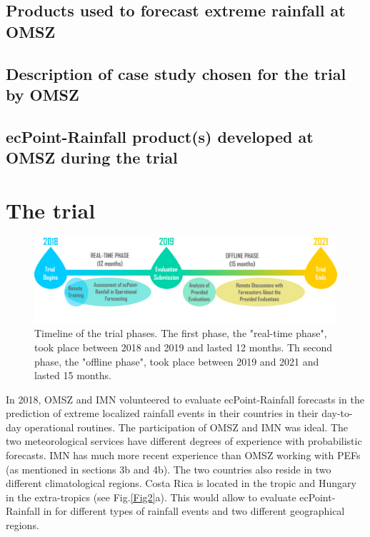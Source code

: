 \documentclass[twocol]{ametsocV5} %
\begin{document}
\subsection{Products used to forecast extreme rainfall at OMSZ}

\subsection{Description of case study chosen for the trial by OMSZ}

\subsection{ecPoint-Rainfall product(s) developed at OMSZ during the trial}



\section{The trial} 

\begin{figure}
\centerline{\includegraphics[width=39pc]{manuscript/Figures/Fig4.png}}
\caption{Timeline of the trial phases. The first phase, the "real-time phase", took place between 2018 and 2019 and lasted 12 months. Th second phase, the "offline phase", took place between 2019 and 2021 and lasted 15 months.}
\label{Fig4}
\end{figure}

In 2018, OMSZ and IMN volunteered to evaluate ecPoint-Rainfall forecasts in the prediction of extreme localized rainfall events in their countries in their day-to-day operational routines. The participation of OMSZ and IMN was ideal. The two meteorological services have different degrees of experience with probabilistic forecasts. IMN has much more recent experience than OMSZ working with PEFs (as mentioned in sections 3b and 4b). The two countries also reside in two different climatological regions. Costa Rica is located in the tropic and Hungary in the extra-tropics (see Fig.\ref{Fig2}a). This would allow to evaluate ecPoint-Rainfall in for different types of rainfall events and two different geographical regions.
\end{document}
